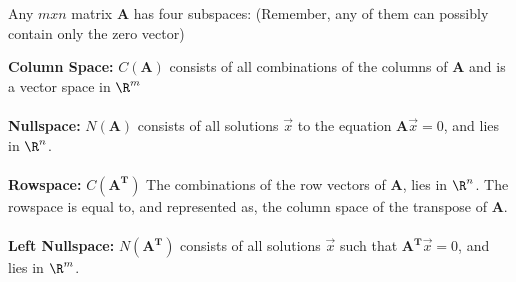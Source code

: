 

 \\ \\
Any $mxn$ matrix $\mathbf{A}$ has four subspaces: (Remember, any of them can possibly contain only the zero vector) 

\textbf{Column Space:} $C(\mathbf{A})$ consists of all combinations of the columns of $\mathbf{A}$ and is a vector space in $\R^{m}$ \\ \\
\textbf{Nullspace:} $N(\mathbf{A})$ consists of all solutions $\vec{x}$ to the equation $\mathbf{A}\vec{x} = 0$, and lies in $\R^{n}$. \\ \\
\textbf{Rowspace:} $C(\mathbf{A^T})$ The combinations of the row vectors of $\mathbf{A}$, lies in $\R^{n}$. The rowspace is equal to, and represented as, the column space of the transpose of $\mathbf{A}$. \\ \\
\textbf{Left Nullspace:} $N(\mathbf{A^T})$ consists of all solutions $\vec{x}$ such that $\mathbf{A^T}\vec{x} = 0$, and lies in $\R^{m}$. \\ \\



